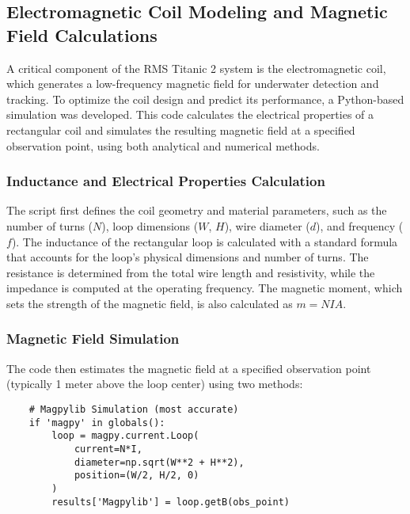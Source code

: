     

\subsection{Electromagnetic Coil Modeling and Magnetic Field Calculations}
A critical component of the RMS Titanic 2 system is the electromagnetic coil, which generates a low-frequency magnetic field for underwater detection and tracking. To optimize the coil design and predict its performance, a Python-based simulation was developed. This code calculates the electrical properties of a rectangular coil and simulates the resulting magnetic field at a specified observation point, using both analytical and numerical methods.

\subsubsection{Inductance and Electrical Properties Calculation}
The script first defines the coil geometry and material parameters, such as the number of turns ($N$), loop dimensions ($W$, $H$), wire diameter ($d$), and frequency ($f$). The inductance of the rectangular loop is calculated with a standard formula that accounts for the loop's physical dimensions and number of turns. The resistance is determined from the total wire length and resistivity, while the impedance is computed at the operating frequency. The magnetic moment, which sets the strength of the magnetic field, is also calculated as $m = NIA$.

\subsubsection{Magnetic Field Simulation}
The code then estimates the magnetic field at a specified observation point (typically 1 meter above the loop center) using two methods:

\begin{verbatim}
    # Magpylib Simulation (most accurate)
    if 'magpy' in globals():
        loop = magpy.current.Loop(
            current=N*I,
            diameter=np.sqrt(W**2 + H**2),
            position=(W/2, H/2, 0)
        )
        results['Magpylib'] = loop.getB(obs_point)
\end{verbatim}

